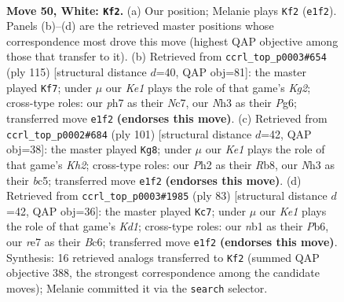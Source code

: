 \documentclass[11pt]{article}
\begin{document}
\clearpage

\begin{figure}[p]\centering
\begin{subfigure}{0.46\textwidth}\centering
\resizebox{\linewidth}{!}{%
\newchessgame
\chessboard[
  setfen={6k1/4rp1p/b5p1/4Pp2/5P2/1B5N/P5PP/1n2K3 w - - 8 50},
  showmover=false,
  pgfstyle=straightmove, color=movearrow, markmove={e1-f2}
]}
\caption{}
\end{subfigure}\hfill
\begin{subfigure}{0.46\textwidth}\centering
\resizebox{\linewidth}{!}{%
\newchessgame
\chessboard[
  setfen={8/2n1p1k1/3p2p1/7p/3R1P2/2p1P3/1r3PKP/2R5 b - - 0 58},
  showmover=false,
  pgfstyle=straightmove, color=movearrow, markmove={g7-f7}
]}
\caption{}
\end{subfigure}
\\[4pt]
\begin{subfigure}{0.46\textwidth}\centering
\resizebox{\linewidth}{!}{%
\newchessgame
\chessboard[
  setfen={1r6/5ppk/4b2p/2BpP3/3P2P1/5PK1/8/7R b - - 12 51},
  showmover=false,
  pgfstyle=straightmove, color=movearrow, markmove={h7-g8}
]}
\caption{}
\end{subfigure}\hfill
\begin{subfigure}{0.46\textwidth}\centering
\resizebox{\linewidth}{!}{%
\newchessgame
\chessboard[
  setfen={3k4/5pp1/1pbn3p/4p3/1P2P3/2NBKP1P/6P1/8 b - - 6 42},
  showmover=false,
  pgfstyle=straightmove, color=movearrow, markmove={d8-c7}
]}
\caption{}
\end{subfigure}
\caption{\textbf{Move 50, White: \texttt{Kf2}.} (a) Our position; Melanie plays \texttt{Kf2} (\texttt{e1f2}). Panels (b)--(d) are the retrieved master positions whose correspondence most drove this move (highest QAP objective among those that transfer to it). (b) Retrieved from \texttt{ccrl\_top\_p0003\#654} (ply 115) [structural distance $d$=40, QAP obj=81]: the master played \texttt{Kf7}; under $\mu$ our \emph{Ke1} plays the role of that game's \emph{Kg2}; cross-type roles: our \emph{p}h7 as their \emph{N}c7, our \emph{N}h3 as their \emph{P}g6; transferred move \texttt{e1f2} \textbf{(endorses this move)}. (c) Retrieved from \texttt{ccrl\_top\_p0002\#684} (ply 101) [structural distance $d$=42, QAP obj=38]: the master played \texttt{Kg8}; under $\mu$ our \emph{Ke1} plays the role of that game's \emph{Kh2}; cross-type roles: our \emph{P}h2 as their \emph{R}b8, our \emph{N}h3 as their \emph{b}c5; transferred move \texttt{e1f2} \textbf{(endorses this move)}. (d) Retrieved from \texttt{ccrl\_top\_p0003\#1985} (ply 83) [structural distance $d$=42, QAP obj=36]: the master played \texttt{Kc7}; under $\mu$ our \emph{Ke1} plays the role of that game's \emph{Kd1}; cross-type roles: our \emph{n}b1 as their \emph{P}b6, our \emph{r}e7 as their \emph{B}c6; transferred move \texttt{e1f2} \textbf{(endorses this move)}. Synthesis: 16 retrieved analogs transferred to \texttt{Kf2} (summed QAP objective 388, the strongest correspondence among the candidate moves); Melanie committed it via the \texttt{search} selector.}
\label{fig:thought-m98}
\end{figure}
\end{document}
